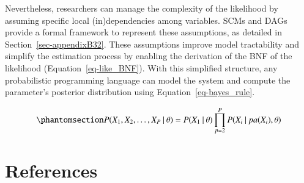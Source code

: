\documentclass[
  authoryear,
  review,
  1p]{elsarticle}
\begin{document}
Nevertheless, researchers can manage the complexity of the likelihood by
assuming specific local (in)dependencies among variables. SCMs and DAGs
provide a formal framework to represent these assumptions, as detailed
in Section~\ref{sec-appendixB32}. These assumptions improve model
tractability and simplify the estimation process by enabling the
derivation of the BNF of the likelihood (Equation~\ref{eq-like_BNF}).
With this simplified structure, any probabilistic programming language
can model the system and compute the parameter's posterior distribution
using Equation~\ref{eq-bayes_rule}.

\begin{equation}\phantomsection\label{eq-like_BNF}{
P(X_{1}, X_{2}, \dots, X_{P} \:|\:\theta) = P(X_{1} \:|\:\theta) \prod^{P}_{p=2} P(X_{i} \:|\:pa(X_{i}), \theta )
}\end{equation}

\newpage{}

\section*{References}\label{references}

\renewcommand{\bibsection}{}

\end{document}
